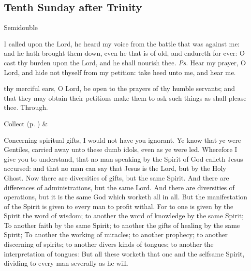 \clearpage
\subsection{Tenth Sunday after Trinity}
\begin{inhead}
{Semidouble}
\end{inhead}


\introit
{} I called upon the Lord, he heard my voice from the battle that was against me: and he hath brought them down, even he that is of old, and endureth for ever: O cast thy burden upon the Lord, and he shall nourish thee. \textit{Ps.} Hear my prayer, O Lord, and hide not thyself from my petition: take heed unto me, and hear me.

\collect
{} thy merciful ears, O Lord, be open to the prayers of thy humble servants; and that they may obtain their petitions make them to ask such things as shall please thee. Through.
\begin{rubric}
     Collect  (p. \pageref{SPSaints}) \&  
\end{rubric}

 Concerning spiritual gifts, I would not have you ignorant. Ye know that ye were Gentiles, carried away unto these dumb idols, even as ye were led. Wherefore I give you to understand, that no man speaking by the Spirit of God calleth Jesus accursed: and that no man can say that Jesus is the Lord, but by the Holy Ghost. Now there are diversities of gifts, but the same Spirit. And there are differences of administrations, but the same Lord. And there are diversities of operations, but it is the same God which worketh all in all. But the manifestation of the Spirit is given to every man to profit withal. For to one is given by the Spirit the word of wisdom; to another the word of knowledge by the same Spirit; To another faith by the same Spirit; to another the gifts of healing by the same Spirit; To another the working of miracles; to another prophecy; to another discerning of spirits; to another divers kinds of tongues; to another the interpretation of tongues: But all these worketh that one and the selfsame Spirit, dividing to every man severally as he will.


